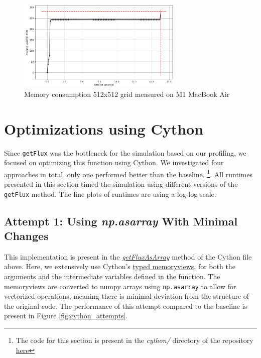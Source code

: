 \documentclass[a4paper,10pt]{article}
\begin{document}
\begin{figure}[h]
  \centering
  \includegraphics[width=0.7\textwidth]{images/baseline/baseline_memory_512.png}
  \caption{Memory consumption 512x512 grid measured on M1 MacBook Air}
  \label{fig:memory_over_simulation}
\end{figure}

\section{Optimizations using Cython}
Since \verb|getFlux| was the bottleneck for the simulation based on our profiling, we focused on optimizing this function using Cython.
We investigated four approaches in total, only one performed better than the baseline. \footnote{The code for this section is present in the \textit{cython/} directory of the repository \href{https://github.com/paulmyr/DD2358-HPC25/blob/master/10_project_rishi_paul/code/cython/finitevolume_cython_lib.pyx}{here}}.
All runtimes presented in this section timed the simulation using different versions of the \verb|getFlux| method.
The line plots of runtimes are using a log-log scale.

\subsection{Attempt 1: Using \textit{np.asarray} With Minimal Changes}
This implementation is present in the \href{https://github.com/paulmyr/DD2358-HPC25/blob/master/10_project_rishi_paul/code/cython/finitevolume_cython_lib.pyx#L8}{\textit{getFluxAsArray}} method of the Cython file above. Here, we extensively use Cython's \underline{typed memoryviews}, for both the arguments and the intermediate variables defined in the function. The memoryviews are converted to numpy arrays using \verb|np.asarray| to allow for vectorized operations, meaning there is minimal deviation from the structure of the original code. The performance of this attempt compared to the baseline is present in Figure \ref{fig:cython_attempts}. 
\end{document}
